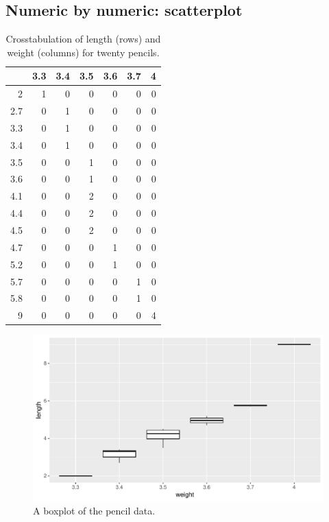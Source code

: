 \documentclass[]{book}\usepackage[]{graphicx}\usepackage[]{color}
\makeatletter
\def\maxwidth{ %
  \ifdim\Gin@nat@width>\linewidth
    \linewidth
  \else
    \Gin@nat@width
  \fi
}
\makeatother
\begin{document}
\subsection{Numeric by numeric: scatterplot}

\begin{table}[ht]
\centering
\caption{Crosstabulation of length (rows) and weight (columns) for twenty pencils.} 
\label{tab:crosstable_4}
\begin{tabular}{rrrrrrr}
  \hline
 & 3.3 & 3.4 & 3.5 & 3.6 & 3.7 & 4 \\ 
  \hline
2 &   1 &   0 &   0 &   0 &   0 &   0 \\ 
  2.7 &   0 &   1 &   0 &   0 &   0 &   0 \\ 
  3.3 &   0 &   1 &   0 &   0 &   0 &   0 \\ 
  3.4 &   0 &   1 &   0 &   0 &   0 &   0 \\ 
  3.5 &   0 &   0 &   1 &   0 &   0 &   0 \\ 
  3.6 &   0 &   0 &   1 &   0 &   0 &   0 \\ 
  4.1 &   0 &   0 &   2 &   0 &   0 &   0 \\ 
  4.4 &   0 &   0 &   2 &   0 &   0 &   0 \\ 
  4.5 &   0 &   0 &   2 &   0 &   0 &   0 \\ 
  4.7 &   0 &   0 &   0 &   1 &   0 &   0 \\ 
  5.2 &   0 &   0 &   0 &   1 &   0 &   0 \\ 
  5.7 &   0 &   0 &   0 &   0 &   1 &   0 \\ 
  5.8 &   0 &   0 &   0 &   0 &   1 &   0 \\ 
  9 &   0 &   0 &   0 &   0 &   0 &   4 \\ 
   \hline
\end{tabular}
\end{table}



\begin{figure}

{\centering \includegraphics[width=\maxwidth]{figure/crosstable_5-1} 

}

\caption[A boxplot of the pencil data]{A boxplot of the pencil data.}\label{fig:crosstable_5}
\end{figure}
\end{document}
